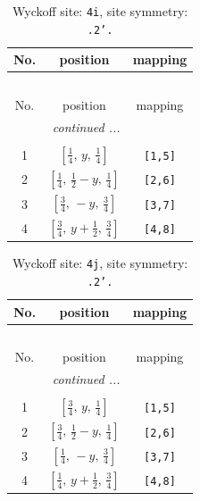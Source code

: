\documentclass[fleqn,8pt]{jsarticle}
\begin{document}
\renewcommand{\arraystretch}{1.2}
\begin{longtable}{ccc}
\caption{Wyckoff site: {\tt 4i}, site symmetry: {\tt .2'.}}
 \\
 \hline \hline
No. & position & mapping \\ \hline \endfirsthead

\multicolumn{2}{l}{\tablename\ \thetable{}} \\
 \hline \hline
No. & position & mapping \\ \hline \endhead

 \hline \hline
\multicolumn{2}{r}{\footnotesize\it continued ...} \\ \endfoot

 \hline \hline
\multicolumn{2}{r}{} \\ \endlastfoot

1 & $\left[ \frac{1}{4},\, y,\, \frac{1}{4} \right]$ & {\tt [1,5]} \\ \hline
2 & $\left[ \frac{1}{4},\, \frac{1}{2} - y,\, \frac{1}{4} \right]$ & {\tt [2,6]} \\ \hline
3 & $\left[ \frac{3}{4},\, - y,\, \frac{3}{4} \right]$ & {\tt [3,7]} \\ \hline
4 & $\left[ \frac{3}{4},\, y + \frac{1}{2},\, \frac{3}{4} \right]$ & {\tt [4,8]} \\
\end{longtable}
\renewcommand{\arraystretch}{1.2}
\begin{longtable}{ccc}
\caption{Wyckoff site: {\tt 4j}, site symmetry: {\tt .2'.}}
 \\
 \hline \hline
No. & position & mapping \\ \hline \endfirsthead

\multicolumn{2}{l}{\tablename\ \thetable{}} \\
 \hline \hline
No. & position & mapping \\ \hline \endhead

 \hline \hline
\multicolumn{2}{r}{\footnotesize\it continued ...} \\ \endfoot

 \hline \hline
\multicolumn{2}{r}{} \\ \endlastfoot

1 & $\left[ \frac{3}{4},\, y,\, \frac{1}{4} \right]$ & {\tt [1,5]} \\ \hline
2 & $\left[ \frac{3}{4},\, \frac{1}{2} - y,\, \frac{1}{4} \right]$ & {\tt [2,6]} \\ \hline
3 & $\left[ \frac{1}{4},\, - y,\, \frac{3}{4} \right]$ & {\tt [3,7]} \\ \hline
4 & $\left[ \frac{1}{4},\, y + \frac{1}{2},\, \frac{3}{4} \right]$ & {\tt [4,8]} \\
\end{longtable}
\end{document}
